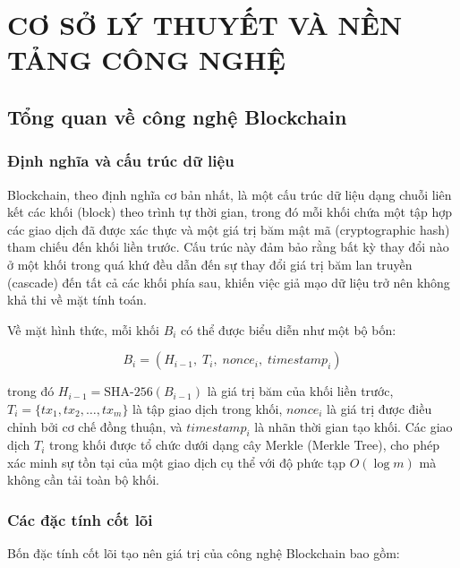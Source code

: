 \chapter{CƠ SỞ LÝ THUYẾT VÀ NỀN TẢNG CÔNG NGHỆ}

\section{Tổng quan về công nghệ Blockchain}

\subsection{Định nghĩa và cấu trúc dữ liệu}

Blockchain, theo định nghĩa cơ bản nhất, là một cấu trúc dữ liệu dạng chuỗi liên kết các khối (block) theo trình tự thời gian, trong đó mỗi khối chứa một tập hợp các giao dịch đã được xác thực và một giá trị băm mật mã (cryptographic hash) tham chiếu đến khối liền trước. Cấu trúc này đảm bảo rằng bất kỳ thay đổi nào ở một khối trong quá khứ đều dẫn đến sự thay đổi giá trị băm lan truyền (cascade) đến tất cả các khối phía sau, khiến việc giả mạo dữ liệu trở nên không khả thi về mặt tính toán.

Về mặt hình thức, mỗi khối $B_i$ có thể được biểu diễn như một bộ bốn:

\begin{equation}
B_i = (H_{i-1}, \; T_i, \; nonce_i, \; timestamp_i)
\end{equation}

trong đó $H_{i-1} = \text{SHA-256}(B_{i-1})$ là giá trị băm của khối liền trước, $T_i = \{tx_1, tx_2, \ldots, tx_m\}$ là tập giao dịch trong khối, $nonce_i$ là giá trị được điều chỉnh bởi cơ chế đồng thuận, và $timestamp_i$ là nhãn thời gian tạo khối. Các giao dịch $T_i$ trong khối được tổ chức dưới dạng cây Merkle (Merkle Tree), cho phép xác minh sự tồn tại của một giao dịch cụ thể với độ phức tạp $O(\log m)$ mà không cần tải toàn bộ khối.

\subsection{Các đặc tính cốt lõi}

Bốn đặc tính cốt lõi tạo nên giá trị của công nghệ Blockchain bao gồm:


